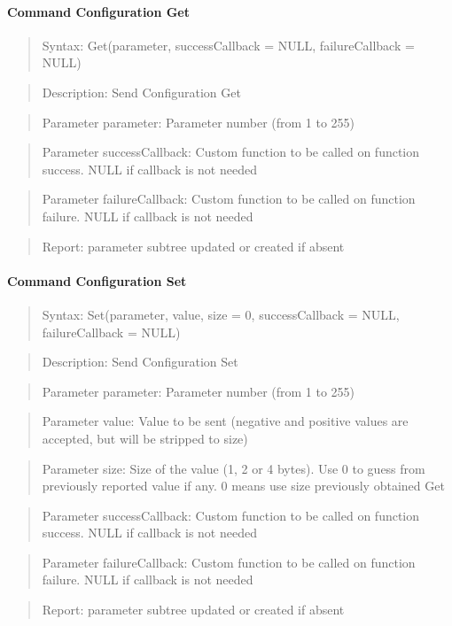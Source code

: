 \paragraph{Command Configuration Get}
\begin{quote}Syntax: Get(parameter, successCallback = NULL, failureCallback = NULL)\end{quote}
\begin{quote}Description: Send Configuration Get\end{quote}
\begin{quote}Parameter parameter: Parameter number (from 1 to 255)\end{quote}
\begin{quote}Parameter successCallback: Custom function to be called on function success. NULL if callback is not needed\end{quote}
\begin{quote}Parameter failureCallback: Custom function to be called on function failure. NULL if callback is not needed\end{quote}
\begin{quote}Report: parameter subtree updated or created if absent\end{quote}

\paragraph{Command Configuration Set}
\begin{quote}Syntax: Set(parameter, value, size = 0, successCallback = NULL, failureCallback = NULL)\end{quote}
\begin{quote}Description: Send Configuration Set\end{quote}
\begin{quote}Parameter parameter: Parameter number (from 1 to 255)\end{quote}
\begin{quote}Parameter value: Value to be sent (negative and positive values are accepted, but will be stripped to size)\end{quote}
\begin{quote}Parameter size: Size of the value (1, 2 or 4 bytes). Use 0 to guess from previously reported value if any. 0 means use size previously obtained Get\end{quote}
\begin{quote}Parameter successCallback: Custom function to be called on function success. NULL if callback is not needed\end{quote}
\begin{quote}Parameter failureCallback: Custom function to be called on function failure. NULL if callback is not needed\end{quote}
\begin{quote}Report: parameter subtree updated or created if absent\end{quote}

